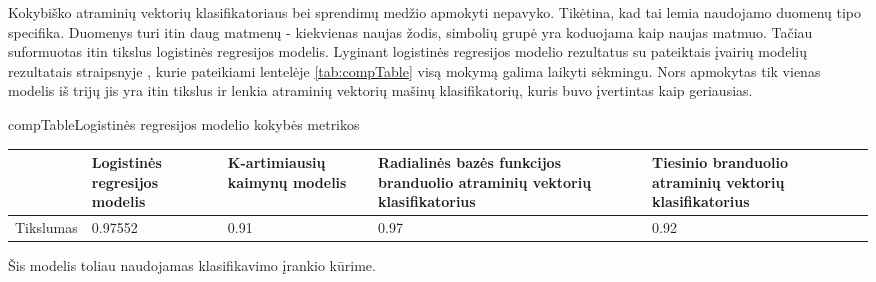 
Kokybiško atraminių vektorių klasifikatoriaus bei sprendimų medžio apmokyti nepavyko.
Tikėtina, kad tai lemia naudojamo duomenų tipo specifika. Duomenys turi itin daug
matmenų - kiekvienas naujas žodis, simbolių grupė yra koduojama kaip naujas matmuo.
Tačiau suformuotas itin tikslus logistinės regresijos modelis. Lyginant logistinės regresijos modelio rezultatus
su pateiktais įvairių modelių rezultatais straipsnyje \cite{comp}, kurie pateikiami
lentelėje \vref{tab:compTable} visą mokymą galima laikyti sėkmingu. Nors apmokytas
tik vienas modelis iš trijų jis yra itin tikslus ir lenkia atraminių vektorių mašinų klasifikatorių, kuris buvo įvertintas kaip geriausias.

\begin{ktutable}{compTable}{Logistinės regresijos modelio kokybės metrikos}
    \begin{tabular}{|l|p{3cm}|p{3cm}|p{3cm}|p{3cm}|}
    \hline
                             & Logistinės regresijos modelis  &  K-artimiausių kaimynų modelis  &  Radialinės bazės funkcijos branduolio atraminių vektorių klasifikatorius  &  Tiesinio branduolio atraminių vektorių klasifikatorius \\ \hline
               Tikslumas     & 0.97552           & 0.91   & 0.97  &  0.92         \\ \hline
    \end{tabular}
\end{ktutable}

Šis modelis toliau naudojamas klasifikavimo įrankio kūrime.

